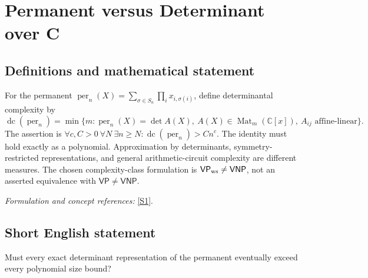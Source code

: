 \documentclass[11pt,a4paper]{article}
\newcommand{\C}{\mathbb{C}}
\newcommand{\sref}[2]{\hyperlink{source:#1:#2}{[S#2]}}
\newif\ifshowcatalogue
\newcommand{\cataloguescope}[1]{\ifshowcatalogue
 \paragraph{Exact scope in the supplied catalogue.}
 \begin{quote}\small #1\end{quote}\fi}
\numberwithin{equation}{section}
\begin{document}
\setcounter{section}{56}
\clearpage
\section{\texorpdfstring{Permanent versus Determinant over C}{Permanent versus Determinant over C}}\label{57}
\subsection{Definitions and mathematical statement}
For the permanent $\operatorname{per}_n(X)=\sum_{\sigma\in S_n}\prod_i x_{i,\sigma(i)}$, define determinantal complexity by
\[
 \operatorname{dc}(\operatorname{per}_n)=\min\{m:\operatorname{per}_n(X)=\det A(X),\
 A(X)\in\operatorname{Mat}_m(\C[x]),\ A_{ij}\text{ affine-linear}\}.
\]
The assertion is $\forall c,C>0\ \forall N\ \exists n\ge N:\operatorname{dc}(\operatorname{per}_n)>Cn^c$. The identity must hold exactly as a polynomial. Approximation by determinants, symmetry-restricted representations, and general arithmetic-circuit complexity are different measures. The chosen complexity-class formulation is $\mathsf{VP}_{\rm ws}\ne\mathsf{VNP}$, not an asserted equivalence with $\mathsf{VP}\ne\mathsf{VNP}$.
\par\smallskip\textit{Formulation and concept references:} \sref{57}{1}.
\cataloguescope{Over C, let dc(per\_n) be the least m for which the n\ensuremath{\times}n permanent per\_n(X) equals the determinant of an m\ensuremath{\times}m matrix whose entries are affine-linear forms in the n\textasciicircum{}2 variables X, as an exact polynomial identity. Assert that dc(per\_n) is not O(n\textasciicircum{}c) for any real constant c>0: explicitly, for every c>0, C>0 and integer N\ensuremath{\ge}1, some n\ensuremath{\ge}N satisfies dc(per\_n)>C*n\textasciicircum{}c. No restrictions of equivariance, sparsity or symmetry are imposed on the representing matrix. This is exact, not border, determinantal complexity over C; the selected assertion is the source’s VP\_ws != VNP formulation, not an assertion that it is equivalent to VP != VNP.}
\subsection{Short English statement}
Must every exact determinant representation of the permanent eventually exceed every polynomial size bound?
\end{document}
